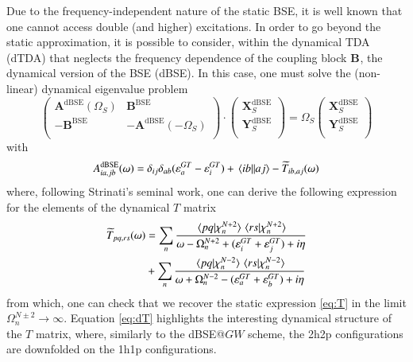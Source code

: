\documentclass[aip,jcp,reprint,noshowkeys,superscriptaddress]{revtex4-1}
\newcommand{\BSE}{\text{BSE}}
\newcommand{\dBSE}{\text{dBSE}}
\newcommand{\GT}{GT}
\newcommand{\e}[2]{\eps_{#1}^{#2}}
\newcommand{\Om}[2]{\Omega_{#1}^{#2}}
\newcommand{\bA}[2]{\mathbf{A}_{#1}^{#2}}
\newcommand{\bB}[2]{\mathbf{B}_{#1}^{#2}}
\newcommand{\bX}[2]{\mathbf{X}_{#1}^{#2}}
\newcommand{\bY}[2]{\mathbf{Y}_{#1}^{#2}}
\newcommand{\eps}{\varepsilon}
\begin{document}
Due to the frequency-independent nature of the static BSE, it is well known that one cannot access double (and higher) excitations.
\cite{Loos_2019,Romaniello_2009b,Sangalli_2011,Loos_2020h,Authier_2020,Monino_2021}
In order to go beyond the static approximation, it is possible to consider, within the dynamical TDA (dTDA) that neglects the frequency dependence of the coupling block $\bB{}{}$, the dynamical version of the BSE (dBSE). \cite{Strinati_1988,Romaniello_2009b,Loos_2020h}
In this case, one must solve the (non-linear) dynamical eigenvalue problem
\begin{equation}
\label{eq:dBSE}
	\begin{pmatrix}
		\bA{}{\dBSE}(\Om{S}{})	&	\bB{}{\BSE}	\\
		-\bB{}{\BSE}	&	-\bA{}{\dBSE}(-\Om{S}{})	\\
	\end{pmatrix}
	\cdot
	\begin{pmatrix}
		\bX{S}{\dBSE}	\\
		\bY{S}{\dBSE}	\\
	\end{pmatrix}
	=
	\Om{S}{}
	\begin{pmatrix}
		\bX{S}{\dBSE}	\\
		\bY{S}{\dBSE}	\\
	\end{pmatrix}
\end{equation}
with 
\begin{equation}
	A_{ia,jb}^{\dBSE}(\omega) = \delta_{ij} \delta_{ab} (\e{a}{\GT} - \e{i}{\GT}) + \mel{ib}{}{aj} - \widetilde{T}_{ib,aj}(\omega)
\end{equation}
where, following Strinati's seminal work, \cite{Strinati_1988} one can derive the following expression for the elements of the dynamical $T$ matrix
\begin{equation}
\label{eq:dT}
\begin{split}
	\widetilde{T}_{pq,rs}(\omega) 
		& = \sum_{n} \frac{\braket*{pq}{\chi_n^{N+2}}\braket*{rs}{\chi_n^{N+2}}}{\omega - \Om{n}{N+2} + (\e{i}{\GT} + \e{j}{\GT}) + i\eta}
		\\
		& + \sum_{n} \frac{\braket*{pq}{\chi_n^{N-2}}\braket*{rs}{\chi_n^{N-2}}}{\omega + \Om{n}{N-2} - (\e{a}{\GT} + \e{b}{\GT}) + i\eta}
\end{split}
\end{equation}
from which, one can check that we recover the static expression \eqref{eq:T} in the limit $\Om{n}{N\pm2} \to \infty$.
Equation \eqref{eq:dT} highlights the interesting dynamical structure of the $T$ matrix, where, similarly to the dBSE@$GW$ scheme, \cite{Strinati_1988,Romaniello_2009b,Loos_2020h} the 2h2p configurations are downfolded on the 1h1p configurations. \cite{Bintrim_2021b}
\end{document}
